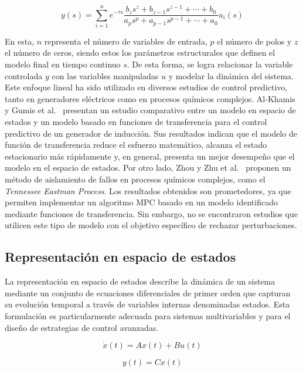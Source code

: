 \begin{equation}
y(s) =
\sum_{i=1}^{n}
e^{-\tau s}
\frac{
b_z s^z + b_{z-1} s^{z-1} + \cdots + b_0
}{
a_p s^p + a_{p-1} s^{p-1} + \cdots + a_0
}
u_i(s)
\label{eq:transfer_function}
\end{equation}

En esta, $n$ representa el número de variables de entrada, $p$ el número de polos y $z$ el número de ceros, siendo estos los parámetros estructurales que definen el modelo final en tiempo continuo $s$. De esta forma, se logra relacionar la variable controlada $y$ con las variables manipuladas $u$ y modelar la dinámica del sistema. Este enfoque lineal ha sido utilizado en diversos estudios de control predictivo, tanto en generadores eléctricos como en procesos químicos complejos. Al-Khamis y Gumis et al.~\cite{ref21} presentan un estudio comparativo entre un modelo en espacio de estados y un modelo basado en funciones de transferencia para el control predictivo de un generador de inducción. Sus resultados indican que el modelo de función de transferencia reduce el esfuerzo matemático, alcanza el estado estacionario más rápidamente y, en general, presenta un mejor desempeño que el modelo en el espacio de estados. Por otro lado, Zhou y Zhu et al.~\cite{ref22} proponen un método de aislamiento de fallos en procesos químicos complejos, como el \textit{Tennessee Eastman Process}. Los resultados obtenidos son prometedores, ya que permiten implementar un algoritmo MPC basado en un modelo identificado mediante funciones de transferencia. Sin embargo, no se encontraron estudios que utilicen este tipo de modelo con el objetivo específico de rechazar perturbaciones.

\subsection{Representación en espacio de estados}

La representación en espacio de estados describe la dinámica de un sistema mediante un conjunto de ecuaciones diferenciales de primer orden que capturan su evolución temporal a través de variables internas denominadas estados. Esta formulación es particularmente adecuada para sistemas multivariables y para el diseño de estrategias de control avanzadas.

\begin{equation}
\dot{x}(t) = A x(t) + B u(t)
\label{eq:statespace_state}
\end{equation}

\begin{equation}
y(t) = C x(t)
\label{eq:statespace_output}
\end{equation}

